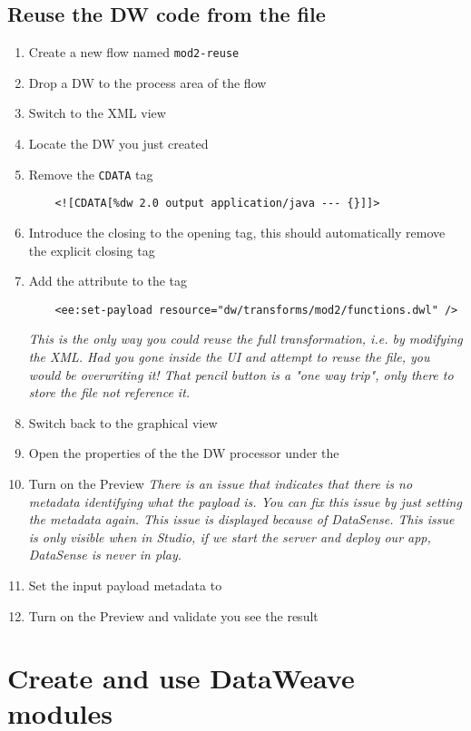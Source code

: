 \subsection{Reuse the DW code from the file}
\begin{enumerate}[resume*]
\item Create a new flow named \lstinline!mod2-reuse!
\item Drop a DW to the process area of the flow
\item Switch to the XML view
\item Locate the DW you just created
\item Remove the \lstinline!CDATA! tag
  \begin{verbatim}
    <![CDATA[%dw 2.0 output application/java --- {}]]>
  \end{verbatim}
\item Introduce the \ttt{/} closing to the opening  tag, this should automatically remove the explicit closing tag
\item Add the attribute  to the  tag
  \begin{verbatim}
    <ee:set-payload resource="dw/transforms/mod2/functions.dwl" />
  \end{verbatim}
  \emph{
    This is the only way you could reuse the full transformation, i.e. by modifying the XML.  Had you gone inside
    the UI and attempt to reuse the file, you would be overwriting it!  That pencil button is a "one way trip",
    only there to store the file not reference it.
  }
\item Switch back to the graphical view
\item Open the properties of the the DW processor under the 
\item Turn on the Preview
  \emph{
    There is an issue that indicates that there is no metadata identifying what the payload is.  You can fix
    this issue by just setting the metadata again.  This issue is displayed because of DataSense.  This issue
    is only visible when in Studio, if we start the server and deploy our app, DataSense is never in play. 
  }
\item Set the input payload metadata to 
\item Turn on the Preview and validate you see the result
\end{enumerate}



\section{Create and use DataWeave modules}


